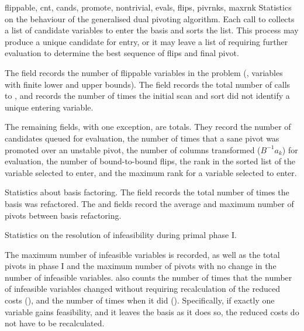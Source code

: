 \begin{codedoc}
  \item{}%
	      {flippable, cnt, cands, promote, nontrivial, evals, flips,
	       pivrnks, maxrnk}
  Statistics on the behaviour of the generalised dual pivoting algorithm.
  Each call to  collects a list of candidate variables to
  enter the basis and sorts the list.
  This process may produce a unique candidate for entry, or it may leave a list
  of requiring further evaluation to determine the best sequence of flips and
  final pivot.

  The  field records the number of flippable variables in the
  problem (\ie, variables with finite lower and upper bounds).
  The  field records the total number of calls to
  , and  records the number of times
  the initial scan and sort did not identify a unique entering variable.

  The remaining fields, with one exception, are totals.
  They record the number of candidates queued for evaluation,
  the number of times that a sane pivot was promoted over an unstable pivot,
  the number of columns transformed ($B^{-1}a_k$) for evaluation,
  the number of bound-to-bound flips,
  the rank in the sorted list of the variable selected to
  enter, and the maximum rank for a variable selected to enter.


  \item{}
  Statistics about basis factoring.
  The  field records the total number of times the basis was
  refactored.
  The  and  fields record the average and maximum
  number of pivots between basis refactoring.

  \item{}
  Statistics on the resolution of infeasibility during primal phase I.

  The maximum number of infeasible variables is recorded, as well as the total
  pivots in phase I and the maximum number of pivots with no change in the
  number of infeasible variables.
  \dylp also counts the number of times that the number of infeasible variables
  changed without requiring recalculation of the reduced costs
  (), and the number of times when it did ().
  Specifically, if exactly one variable gains feasibility, and it leaves the
  basis as it does so, the reduced costs do not have to be recalculated.


\end{codedoc}
